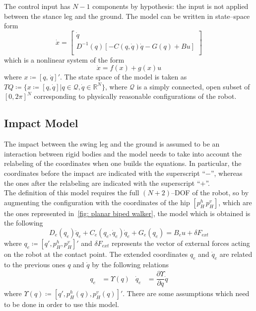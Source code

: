 \documentclass[11pt]{article}
\begin{document}
The control input has $N-1$ components by hypothesis: the input is not applied between the stance leg and the ground. The model can be written in state--space form
\begin{equation}
\dot{x} = 
\begin{bmatrix}
\dot{q}\\
D^{-1}(q)[-C(q,\dot{q})\dot{q} -G(q) +Bu]\\
\end{bmatrix}
\end{equation}
which is a nonlinear system of the form
\begin{equation}
\dot{x} = f(x) + g(x)u
\end{equation}
where $x \coloneqq [q, \, \dot{q}]'$. The state space of the model is taken as $TQ \coloneqq \{x \coloneqq [q,\dot{q}]\vert q \in \mathcal{Q}, \dot{q} \in \mathbb{R}^N\}$, where $\mathcal{Q}$ is a simply connected, open subset of $[0, 2 \pi]^N$ corresponding to physically reasonable configurations of the robot.

\subsection{Impact Model}

The impact between the swing leg and the ground is assumed to be an interaction between rigid bodies and the model needs to take into account the relabeling of the coordinates when one builds the equations. In particular, the coordinates before the impact are indicated with the superscript ``$-$'', whereas the ones after the relabeling are indicated with the superscript ``$+$''.\\
The definition of this model requires the full $(N+2)$--DOF of the robot, so by augmenting the configuration with the coordinates of the hip $[p^h_H\,p^v_H]$, which are the ones represented in \figurename \,\ref{fig: planar biped walker}, the model which is obtained is the following
\begin{equation}
D_e(q_e)\ddot{q}_e + C_e(q_e,\dot{q}_e)\dot{q}_e + G_e(q_e) = B_eu + \delta F_{ext}
\label{extModel}
\end{equation}
where $q_e \coloneqq [q',p^h_H,p^v_H]'$ and $\delta F_{ext}$ represents the vector of external forces acting on the robot at the contact point. The extended coordinates $q_e$ and $\dot{q}_e$ are related to the previous ones $q$ and $\dot{q}$ by the following relations
\begin{align*}
q_e &= \Upsilon(q) & \dot{q}_e &= \dfrac{\partial \Upsilon}{\partial q}\dot{q}
\end{align*}
where $\Upsilon(q) \coloneqq [q',p^h_H(q),p^v_H(q)]'$. There are some assumptions which need to be done in order to use this model.
\end{document}
